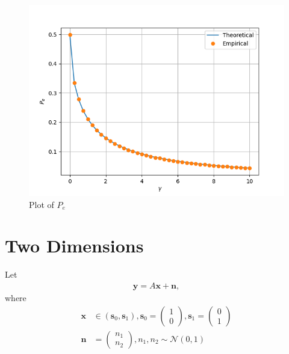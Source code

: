 \documentclass[journal,12pt,twocolumn]{IEEEtran}
\providecommand{\brak}[1]{\ensuremath{\left(#1\right)}}
\providecommand{\gauss}[2]{\mathcal{N}\ensuremath{\left(#1,#2\right)}}
\let\vec\mathbf
\numberwithin{equation}{section}
\renewcommand\thesection{\arabic{section}}
\newcommand{\myvec}[1]{\ensuremath{\begin{pmatrix}#1\end{pmatrix}}}
\begin{document}
\begin{enumerate}[label=\thesection.\arabic*,ref=\thesection.\theenumi]
	\begin{figure}
		\centering
		\includegraphics[width=\columnwidth]{./figs/7.1.png}
		\caption{Plot of $P_e$}
		\label{fig-7.4}
	\end{figure}
	\end{enumerate}
	
	\section{Two Dimensions}
	Let 
	\begin{align}
		\vec{y} = A\vec{x} + \vec{n},
	\end{align}
	where 
	\begin{align}
		\vec{x} &\in \brak{\vec{s}_0,\vec{s}_1}, 
		\vec{s}_0 = \myvec{1 \\ 0},
		\vec{s}_1 = \myvec{0 \\ 1} \\
		\vec{n} &= \myvec{n_1 \\ n_2},
		n_1,n_2 \sim \gauss{0}{1}
	\end{align}
	
\end{document}
